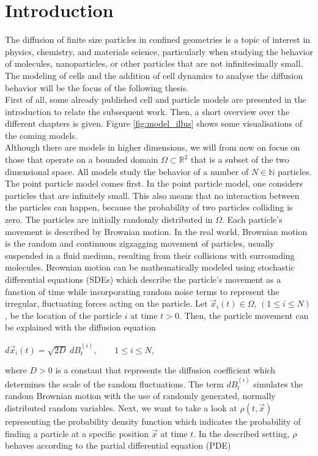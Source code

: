 \documentclass[a4paper,12pt,leqno]{article}
\theoremstyle{plain}
\theoremstyle{remark}
\newcommand{\R}{\mathbb{R}}
\newcommand{\N}{\mathbb{N}}
\begin{document}
\section{Introduction}
The diffusion of finite size particles in confined geometries is a topic of interest in physics, chemistry, and materials science, particularly when studying the behavior of molecules, nanoparticles, or other particles that are not infinitesimally small. \\
The modeling of cells and the addition of cell dynamics to analyse the diffusion behavior will be the focus of the following thesis. \\
First of all, some already published cell and particle models are presented in the introduction to relate the subsequent work. Then, a short overview over the different chapters is given. Figure \ref{fig:model_illus} shows some visualisations of the coming models.\\
Although there are models in higher dimensions, we will from now on focus on those that operate on a bounded domain $\Omega \subset \R^2$ that is a subset of the two dimensional space. All models study the behavior of a number of $N \in \N$  particles. \\
The point particle model comes first. In the point particle model, one considers particles that are infinitely small. This also means that no interaction between the particles can happen, because the probability of two particles colliding is zero. The particles are initially randomly distributed in $\Omega$. Each particle's movement is described by Brownian motion. In the real world, Brownian motion is the random and continuous zigzagging movement of particles, usually suspended in a fluid medium, resulting from their collisions with surrounding molecules. Brownian motion can be mathematically modeled using stochastic differential equations (SDEs) which describe the particle's movement as a function of time while incorporating random noise terms to represent the irregular, fluctuating forces acting on the particle. Let $\vec{x}_i(t) \in \Omega$, $(1 \leq i \leq N)$, be the location of the particle $i$ at time $t > 0$. Then, the particle movement can be explained with the diffusion equation
\begin{center}
	$d\vec{x}_i(t) = \sqrt{2D} \: dB_t^{(i)}, \qquad 1 \leq i \leq N$,
\end{center}
where $D > 0$ is a constant that represents the diffusion coefficient which determines the scale of the random fluctuations. The term $dB_t^{(i)}$ simulates the random Brownian motion with the use of randomly generated, normally distributed random variables. Next, we want to take a look at $\rho(t, \vec{x})$ representing the probability density function which indicates the probability of finding a particle at a specific position $\vec{x}$ at time $t$. In the described setting, $\rho$ behaves according to the partial differential equation (PDE)
\end{document}
